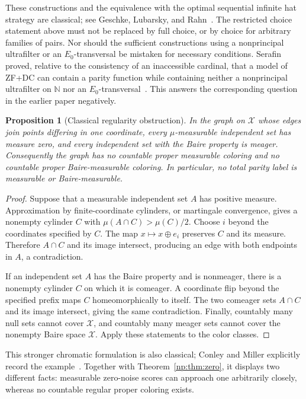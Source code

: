 \documentclass[11pt,a4paper]{article}
\newtheorem{proposition}[theorem]{Proposition}
\theoremstyle{definition}
\theoremstyle{remark}
\newcommand{\N}{\mathbb N}
\newcommand{\cX}{\mathcal X}
\begin{document}
These constructions and the equivalence with the optimal sequential
infinite hat strategy are classical; see Geschke, Lubarsky, and
Rahn~\cite{glr}.  The restricted choice statement above must not be replaced
by full choice, or by choice for arbitrary families of pairs.  Nor should
the sufficient constructions using a nonprincipal ultrafilter or an
$E_0$-transversal be mistaken for necessary conditions.  Serafin proved,
relative to the consistency of an inaccessible cardinal, that a model of
ZF+DC can contain a parity function while containing neither a nonprincipal
ultrafilter on $\N$ nor an $E_0$-transversal~\cite{serafin}.  This answers
the corresponding question in the earlier paper negatively.

\begin{proposition}[Classical regularity obstruction]
\label{np:found:regularity}
In the graph on $\cX$ whose edges join points differing in one coordinate,
every $\mu$-measurable independent set has measure zero, and every
independent set with the Baire property is meager.  Consequently the graph
has no countable proper measurable coloring and no countable proper
Baire-measurable coloring.  In particular, no total parity label is
measurable or Baire-measurable.
\end{proposition}

\begin{proof}
Suppose that a measurable independent set $A$ has positive measure.
Approximation by finite-coordinate cylinders, or martingale convergence,
gives a nonempty cylinder $C$ with
$\mu(A\cap C)>\mu(C)/2$.  Choose $i$ beyond the coordinates specified by
$C$.  The map $x\mapsto x\oplus e_i$ preserves $C$ and its measure.
Therefore $A\cap C$ and its image intersect, producing an edge with both
endpoints in $A$, a contradiction.

If an independent set $A$ has the Baire property and is nonmeager, there
is a nonempty cylinder $C$ on which it is comeager.  A coordinate flip
beyond the specified prefix maps $C$ homeomorphically to itself.  The two
comeager sets $A\cap C$ and its image intersect, giving the same
contradiction.  Finally, countably many null sets cannot cover $\cX$, and
countably many meager sets cannot cover the nonempty Baire space $\cX$.
Apply these statements to the color classes.
\end{proof}

This stronger chromatic formulation is also classical; Conley and
Miller explicitly record the example~\cite{conleymiller}.  Together with
Theorem~\ref{np:thm:zero}, it displays two different facts: measurable
zero-noise scores can approach one arbitrarily closely, whereas no
countable regular proper coloring exists.
\end{document}
